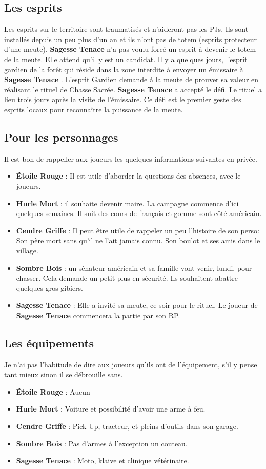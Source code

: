 \documentclass[oneside,12pt]{book}
\newcommand{\Lynn}{\textbf{Étoile Rouge} }
\newcommand{\Jessica}{\textbf{Sagesse Tenace} }
\newcommand{\Luke}{\textbf{Cendre Griffe} }
\newcommand{\Peter}{\textbf{Hurle Mort} }
\newcommand{\Leonard}{\textbf{Sombre Bois} }
\begin{document}
\begin{flushleft}
\clearpage

\subsection{Les esprits}
Les esprits sur le territoire sont traumatisés et n'aideront pas les PJs. Ils sont installés depuis un peu plus d'un an et ils n'ont pas de totem (esprits protecteur d'une meute). 
\Jessica n'a pas voulu forcé un esprit à devenir le totem de la meute. Elle attend qu'il y est un candidat. 
Il y a quelques jours, l'esprit gardien de la forêt qui réside dans la zone interdite à envoyer un émissaire à \Jessica. 
L'esprit Gardien demande à la meute de prouver sa valeur en réalisant le rituel de Chasse Sacrée. 
\Jessica a accepté le défi. Le rituel a lieu trois jours après la visite de l'émissaire. Ce défi est le premier geste des esprits locaux pour reconnaître la puissance de la meute.

\subsection{Pour les personnages}
Il est bon de rappeller aux joueurs les quelques informations suivantes en privée.
\begin{itemize}
\item \Lynn : Il est utile d'aborder la questions des absences, avec le joueurs. 
\item \Peter : il souhaite devenir maire. La campagne commence d'ici quelques semaines. Il suit des cours de français et gomme sont côté américain.
\item \Luke : Il peut être utile de rappeler un peu l'histoire de son perso: Son père mort sans qu'il ne l'ait jamais connu. Son boulot et ses amis dans le village. 
\item \Leonard : un sénateur américain et sa famille vont venir, lundi, pour chasser. Cela demande un petit plus en sécurité. Ils souhaitent abattre quelques gros gibiers. 
\item \Jessica : Elle a invité sa meute, ce soir pour le rituel. Le joueur de \Jessica commencera la partie par son RP. 
\end{itemize}

\subsection{Les équipements}
Je n'ai pas l'habitude de dire aux joueurs qu'ils ont de l'équipement, s'il y pense tant mieux sinon il se débrouille sans.
\begin{itemize}
\item \Lynn : Aucun
\item \Peter : Voiture et possibilité d'avoir une arme à feu.
\item \Luke : Pick Up, tracteur, et pleins d'outils dans son garage.
\item \Leonard : Pas d'armes à l'exception un couteau.
\item \Jessica : Moto, klaive et clinique vétérinaire. 
\end{itemize}


\end{flushleft}
\end{document}
